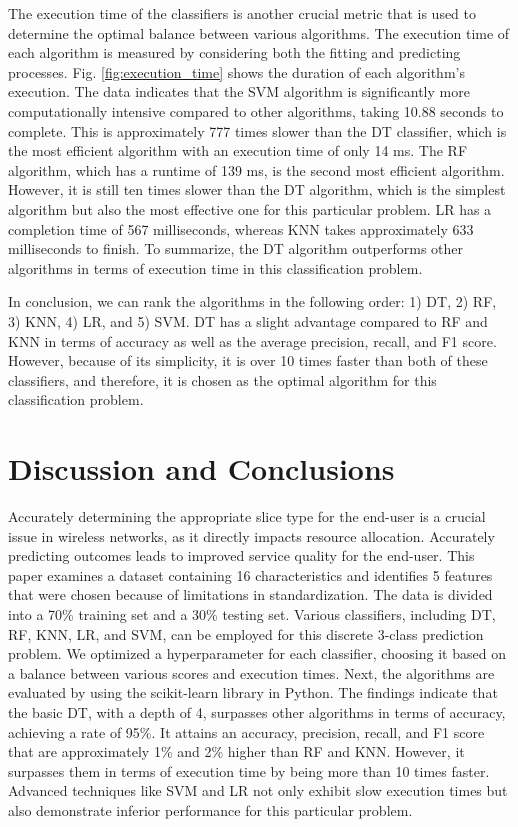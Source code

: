 \documentclass[conference]{IEEEtran}
\begin{document}
The execution time of the classifiers is another crucial metric that is used to determine the optimal balance between various algorithms. The execution time of each algorithm is measured by considering both the fitting and predicting processes. Fig. \ref{fig:execution_time} shows the duration of each algorithm's execution. The data indicates that the SVM algorithm is significantly more computationally intensive compared to other algorithms, taking 10.88 seconds to complete. This is approximately 777 times slower than the DT classifier, which is the most efficient algorithm with an execution time of only 14 ms. The RF algorithm, which has a runtime of 139 ms, is the second most efficient algorithm. However, it is still ten times slower than the DT algorithm, which is the simplest algorithm but also the most effective one for this particular problem. LR has a completion time of 567 milliseconds, whereas KNN takes approximately 633 milliseconds to finish. To summarize, the DT algorithm outperforms other algorithms in terms of execution time in this classification problem.

In conclusion, we can rank the algorithms in the following order: 1) DT, 2) RF, 3) KNN, 4) LR, and 5) SVM. DT has a slight advantage compared to RF and KNN in terms of accuracy as well as the average precision, recall, and F1 score. However, because of its simplicity, it is over 10 times faster than both of these classifiers, and therefore, it is chosen as the optimal algorithm for this classification problem.

\section{Discussion and Conclusions} \label{conclusion}
Accurately determining the appropriate slice type for the end-user is a crucial issue in wireless networks, as it directly impacts resource allocation. Accurately predicting outcomes leads to improved service quality for the end-user. This paper examines a dataset containing 16 characteristics and identifies 5 features that were chosen because of limitations in standardization. The data is divided into a 70\% training set and a 30\% testing set. Various classifiers, including DT, RF, KNN, LR, and SVM, can be employed for this discrete 3-class prediction problem. We optimized a hyperparameter for each classifier, choosing it based on a balance between various scores and execution times. Next, the algorithms are evaluated by using the scikit-learn library in Python. The findings indicate that the basic DT, with a depth of 4, surpasses other algorithms in terms of accuracy, achieving a rate of 95\%. It attains an accuracy, precision, recall, and F1 score that are approximately 1\% and 2\% higher than RF and KNN. However, it surpasses them in terms of execution time by being more than 10 times faster. Advanced techniques like SVM and LR not only exhibit slow execution times but also demonstrate inferior performance for this particular problem. 
\end{document}
